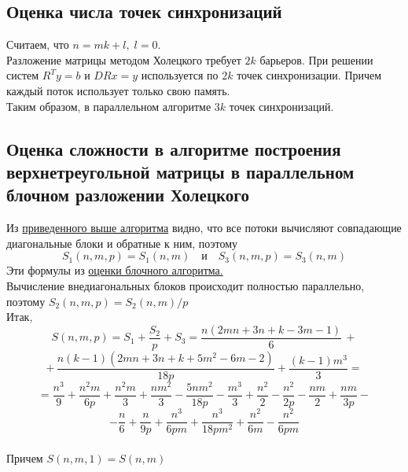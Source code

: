 \documentclass[a4paper,12pt]{article}
\begin{document}
\subsection{Оценка числа точек синхронизаций}
    Считаем, что $n = mk + l,\; l = 0$.\\
    
    Разложение матрицы методом Холецкого требует $2k$ барьеров.
    При решении систем $R^T y = b$ и $DRx = y$ используется по $2k$ точек синхронизации.
    Причем каждый поток использует только свою память.\\
    
    Таким образом, в параллельном алгоритме $3k$ точек синхронизаций.
    

\newpage
\subsection{Оценка сложности в алгоритме построения верхнетреугольной матрицы
в параллельном блочном разложении Холецкого}
    Из \hyperlink{paral_alg}{приведенного выше алгоритма} видно, что все потоки 
    вычисляют совпадающие диагональные блоки и обратные к ним, поэтому 
    $$
        S_1(n,m,p) = S_1(n,m) \quad \text{и} \quad S_3(n,m,p) = S_3(n,m)
    $$
    Эти формулы из \hyperlink{block_border}{оценки блочного алгоритма.} \\
    
    Вычисление внедиагональных блоков происходит полностью параллельно, поэтому 
    $ S_2(n,m,p) = S_2(n,m)/p $ \\

    Итак, 
    $$
        S(n,m,p) = S_1 + \frac{S_2}{p} + S_3 = 
        \frac{n(2mn + 3n + k - 3m -1)}6 \,+ $$$$ +\,
        \frac{n(k-1)(2mn+3n+k+5m^2-6m-2)}{18p} +
        \frac{(k-1)m^3}3 = $$$$ =
        \frac{n^3}9 + \frac{n^2m}{6p} + \frac{n^2m}{3} +
        \frac{nm^2}3 - \frac{5nm^2}{18p} - \frac{m^3}3 +
        \frac{n^2}2 - \frac{n^2}{2p} - \frac{nm}2 + \frac{nm}{3p} - $$$$ -
        \frac{n}6 + \frac{n}{9p} + \frac{n^3}{6pm} + \frac{n^3}{18pm^2} +
        \frac{n^2}{6m} - \frac{n^2}{6pm}
    $$ \\
    
    Причем $S(n,m,1) = S(n,m)$
\end{document}
